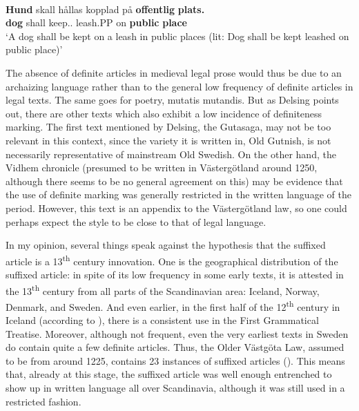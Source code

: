 \ea\label{}
\\
\gll	\textbf{Hund} skall  hållas  kopplad  på  \textbf{offentlig} \textbf{  plats.}\\
		\textbf{dog} shall  keep.{\pass}.{\inf}  leash.PP  on  \textbf{public} \textbf{place}\\
\glt ‘A dog shall be kept on a leash in public places (lit: Dog shall be kept leashed on public place)’

\z

The absence of definite articles in medieval legal prose would thus be due to an archaizing language rather than to the general low frequency of definite articles in legal texts. The same goes for poetry, mutatis mutandis. But as Delsing points out, there are other texts which also exhibit a low incidence of definiteness marking. The first text mentioned by Delsing, the Gutasaga, may not be too relevant in this context, since the variety it is written in, Old Gutnish, is not necessarily representative of mainstream Old Swedish.  On the other hand, the Vidhem chronicle (presumed to be written in Västergötland around 1250, although there seems to be no general agreement on this) may be evidence that the use of definite marking was generally restricted in the written language of the period. However, this text is an appendix to the Västergötland law, so one could perhaps expect the style to be close to that of legal language. 

In my opinion, several things speak against the hypothesis that the suffixed article is a 13\textsuperscript{th} century innovation. One is the geographical distribution of the suffixed article: in spite of its low frequency in some early texts, it is attested in the 13\textsuperscript{th} century from all parts of the Scandinavian area: Iceland, Norway, Denmark, and Sweden.  And even earlier, in the first half of the 12\textsuperscript{th} century in Iceland (according to \citet[§1019]{Perridon2002}), there is a consistent use in the First Grammatical Treatise. Moreover, although not frequent, even the very earliest texts in Sweden do contain quite a few definite articles. Thus, the Older Västgöta Law, assumed to be from around 1225, contains 23 instances of suffixed articles (\citet[24]{Larm1936}). This means that, already at this stage, the suffixed article was well enough entrenched to show up in written language all over Scandinavia, although it was still used in a restricted fashion. 

